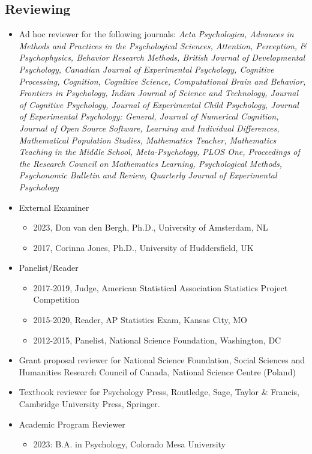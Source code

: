 \documentclass[article,10pt]{article}
\begin{document}
\subsection*{Reviewing}
\label{sec:orgceb846f}

\begin{itemize}
\item Ad hoc reviewer for the following journals: \emph{Acta Psychologica, Advances in Methods and Practices in the Psychological Sciences, Attention, Perception, \& Psychophysics, Behavior Research Methods, British Journal of Developmental Psychology, Canadian Journal of Experimental Psychology, Cognitive Processing, Cognition, Cognitive Science, Computational Brain and Behavior, Frontiers in Psychology, Indian Journal of Science and Technology, Journal of Cognitive Psychology, Journal of Experimental Child Psychology, Journal of Experimental Psychology: General, Journal of Numerical Cognition, Journal of Open Source Software, Learning and Individual Differences, Mathematical Population Studies, Mathematics Teacher, Mathematics Teaching in the Middle School, Meta-Psychology, PLOS One, Proceedings of the Research Council on Mathematics Learning, Psychological Methods, Psychonomic Bulletin and Review, Quarterly Journal of Experimental Psychology}
\item External Examiner
\begin{itemize}
\item 2023, Don van den Bergh, Ph.D., University of Amsterdam, NL
\item 2017, Corinna Jones, Ph.D., University of Huddersfield, UK
\end{itemize}
\item Panelist/Reader
\begin{itemize}
\item 2017-2019, Judge, American Statistical Association Statistics Project Competition
\item 2015-2020, Reader, AP Statistics Exam, Kansas City, MO
\item 2012-2015, Panelist, National Science Foundation, Washington, DC
\end{itemize}
\item Grant proposal reviewer for National Science Foundation, Social Sciences and Humanities Research Council of Canada, National Science Centre (Poland)
\item Textbook reviewer for Psychology Press, Routledge, Sage, Taylor \& Francis, Cambridge University Press, Springer.
\item Academic Program Reviewer
\begin{itemize}
\item 2023: B.A. in Psychology, Colorado Mesa University
\end{itemize}
\end{itemize}
\end{document}
